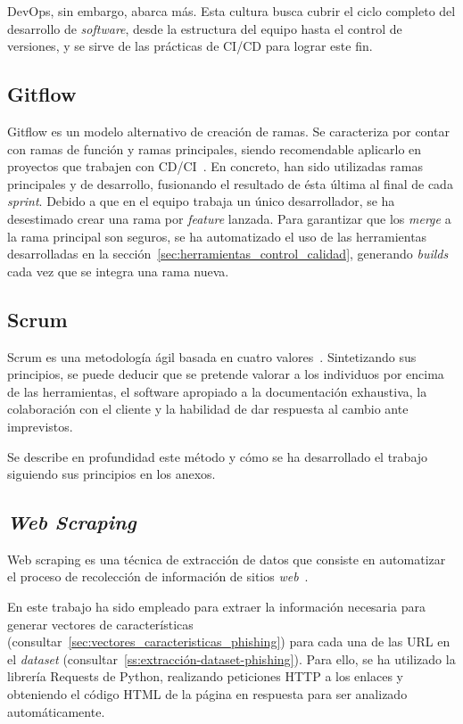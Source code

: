 DevOps, sin embargo, abarca más. Esta cultura busca cubrir el ciclo completo del desarrollo de \textit{software}, desde la estructura del equipo hasta el control de versiones, y se sirve de las prácticas de CI/CD para lograr este fin.

\subsection{Gitflow}

Gitflow es un modelo alternativo de creación de ramas. Se caracteriza por contar con ramas de función y ramas principales, siendo recomendable aplicarlo en proyectos que trabajen con CD/CI~\cite{gitFlow}. En concreto, han sido utilizadas ramas principales y de desarrollo, fusionando el resultado de ésta última al final de cada \textit{sprint}. Debido a que en el equipo trabaja un único desarrollador, se ha desestimado crear una rama por \textit{feature} lanzada. Para garantizar que los \textit{merge} a la rama principal son seguros, se ha automatizado el uso de las herramientas desarrolladas en la sección~\ref{sec:herramientas_control_calidad}, generando \textit{builds} cada vez que se integra una rama nueva.

\subsection{Scrum}

Scrum es una metodología ágil basada en cuatro valores~\cite{scrumMaster2022}. Sintetizando sus principios, se puede deducir que se pretende valorar a los individuos por encima de las herramientas, el software apropiado a la documentación exhaustiva, la colaboración con el cliente y la habilidad de dar respuesta al cambio ante imprevistos.

Se describe en profundidad este método y cómo se ha desarrollado el trabajo siguiendo sus principios en los anexos.

\subsection{\textit{Web Scraping}}

Web scraping es una técnica de extracción de datos que consiste en automatizar el proceso de recolección de información de sitios \textit{web}~\cite{webScraping}.

En este trabajo ha sido empleado para extraer la información necesaria para generar vectores de características (consultar~\ref{sec:vectores_caracteristicas_phishing}) para cada una de las URL en el \textit{dataset} (consultar~\ref{ss:extracción-dataset-phishing}). Para ello, se ha utilizado la librería Requests de Python, realizando peticiones HTTP a los enlaces y obteniendo el código HTML de la página en respuesta para ser analizado automáticamente.

